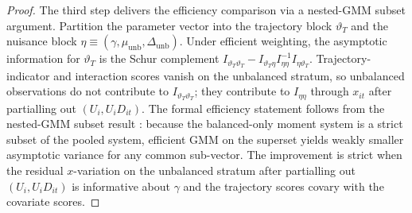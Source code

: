 \begin{proof}
The third step delivers the efficiency comparison via a nested-GMM subset argument.
Partition the parameter vector into the trajectory block $\vartheta_T$ and the nuisance block $\eta \equiv (\gamma,\mu_{\mathrm{unb}},\Delta_{\mathrm{unb}})$.
Under efficient weighting, the asymptotic information for $\vartheta_T$ is the Schur complement $I_{\vartheta_T\vartheta_T} - I_{\vartheta_T\eta}I_{\eta\eta}^{-1}I_{\eta\vartheta_T}$.
Trajectory-indicator and interaction scores vanish on the unbalanced stratum, so unbalanced observations do not contribute to $I_{\vartheta_T\vartheta_T}$; they contribute to $I_{\eta\eta}$ through $x_{it}$ after partialling out $(U_i,U_iD_{it})$.
The formal efficiency statement follows from the nested-GMM subset result \citep{hansen1982gmm}: because the balanced-only moment system is a strict subset of the pooled system, efficient GMM on the superset yields weakly smaller asymptotic variance for any common sub-vector.
The improvement is strict when the residual $x$-variation on the unbalanced stratum after partialling out $(U_i,U_iD_{it})$ is informative about $\gamma$ and the trajectory scores covary with the covariate scores.
\end{proof}


